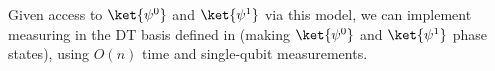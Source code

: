 \begin{lemma}\label{lem:computational efficiency}
    Given access to $\ket{\smash{\psi^{ 0}}}$ and $\ket{\smash{\psi^{ 1}}}$ via this model, we can implement measuring in the DT basis defined in  (making $\ket{\smash{\psi^0}}$ and $\ket{\smash{\psi^1}}$ phase states), using $O(n)$ time and single-qubit measurements.
\end{lemma}
